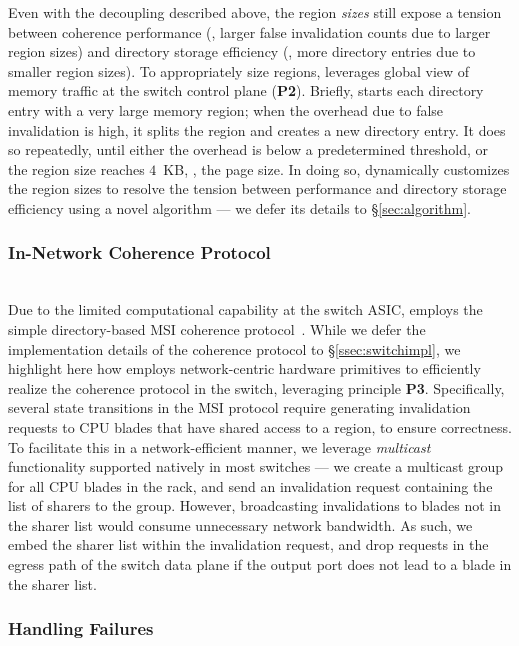  Even with the decoupling described above, the region \textit{sizes} still expose a tension between coherence performance (\eg, larger false invalidation counts due to larger region sizes) and directory storage efficiency (\eg, more directory entries due to smaller region sizes). To appropriately size regions, \mind leverages global view of memory traffic at the switch control plane (\textbf{P2}). Briefly, \mind starts each directory entry with a very large memory region; when the overhead due to false invalidation is high, it splits the region and creates a new directory entry. It does so repeatedly, until either the overhead is below a predetermined threshold, or the region size reaches $4$~KB, \ie, the page size. In doing so, \mind dynamically customizes the region sizes to resolve the tension between performance and directory storage efficiency using a novel \sizing algorithm --- we defer its details to \S\ref{sec:algorithm}.

\subsubsection{In-Network Coherence Protocol}\label{subsec:cache_dir}\hfill\\
\noindent
Due to the limited computational capability at the switch ASIC, \mind employs the simple directory-based MSI coherence protocol~\cite{msi}. While we defer the implementation details of the coherence protocol to \S\ref{ssec:switchimpl}, we highlight here how \mind employs network-centric hardware primitives to efficiently realize the coherence protocol in the switch, leveraging principle \textbf{P3}. Specifically, several state transitions in the MSI protocol require generating invalidation requests to CPU blades that have shared access to a region, to ensure correctness. To facilitate this in a network-efficient manner, we leverage \textit{multicast} functionality supported natively in most switches --- we create a multicast group for all CPU blades in the rack, and send an invalidation request containing the list of sharers to the group. However, broadcasting invalidations to blades not in the sharer list would consume unnecessary network bandwidth. As such, we embed the sharer list within the invalidation request, and drop requests in the egress path of the switch data plane if the output port does not lead to a blade in the sharer list.

\subsubsection{Handling Failures}
\label{sssec:acking}

